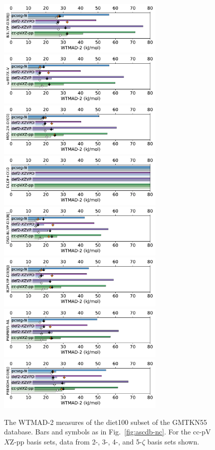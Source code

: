 \documentclass[12pt]{article}
\begin{document}
\begin{figure}[p]
    \includegraphics[width=8cm]{../output/fig_gmtkn55_08.pdf}
    \includegraphics[width=8cm]{../output/fig_gmtkn55_09.pdf}
    \includegraphics[width=8cm]{../output/fig_gmtkn55_10.pdf}
    \includegraphics[width=8cm]{../output/fig_gmtkn55_11.pdf}
    \includegraphics[width=8cm]{../output/fig_gmtkn55_12.pdf}
    \includegraphics[width=8cm]{../output/fig_gmtkn55_13.pdf}
    \includegraphics[width=8cm]{../output/fig_gmtkn55_14.pdf}
    \includegraphics[width=8cm]{../output/fig_gmtkn55_15.pdf}
    \caption{The WTMAD-2 measures of the diet100 subset of the GMTKN55 database. Bars and symbols as in Fig.~\ref{fig:ascdb-nc}. For the cc-pV$X$Z-pp basis sets, data from 2-, 3-, 4-, and 5-$\zeta$ basis sets shown.}
\end{figure}

\clearpage
%
%
\end{document}
